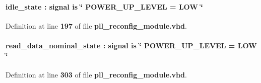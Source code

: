 \paragraph[{A\+L\+T\+E\+R\+A\+\_\+\+A\+T\+T\+R\+I\+B\+U\+TE}]{ {\bfseries {\bfseries {\bf idle\+\_\+state}} \textcolor{vhdlchar}{ }\textcolor{vhdlchar}{\+:}\textcolor{vhdlchar}{ }\textcolor{keywordflow}{signal}\textcolor{vhdlchar}{ }\textcolor{keywordflow}{is}\textcolor{vhdlchar}{ }\textcolor{vhdlchar}{ }\textcolor{vhdlchar}{ }\textcolor{vhdlchar}{ }\textcolor{keyword}{\char`\"{} P\+O\+W\+E\+R\+\_\+\+U\+P\+\_\+\+L\+E\+V\+E\+L = L\+O\+W \char`\"{}}\textcolor{vhdlchar}{ }} \hspace{0.3cm}{\ttfamily [Attribute]}}\label{classpll__reconfig__module__pllrcfg__ok11_1_1RTL_a00ff721b1163687a30ec2eb2ccb311f0}


Definition at line {\bf 197} of file {\bf pll\+\_\+reconfig\+\_\+module.\+vhd}.

\paragraph[{A\+L\+T\+E\+R\+A\+\_\+\+A\+T\+T\+R\+I\+B\+U\+TE}]{ {\bfseries {\bfseries {\bf read\+\_\+data\+\_\+nominal\+\_\+state}} \textcolor{vhdlchar}{ }\textcolor{vhdlchar}{\+:}\textcolor{vhdlchar}{ }\textcolor{keywordflow}{signal}\textcolor{vhdlchar}{ }\textcolor{keywordflow}{is}\textcolor{vhdlchar}{ }\textcolor{vhdlchar}{ }\textcolor{vhdlchar}{ }\textcolor{vhdlchar}{ }\textcolor{keyword}{\char`\"{} P\+O\+W\+E\+R\+\_\+\+U\+P\+\_\+\+L\+E\+V\+E\+L = L\+O\+W \char`\"{}}\textcolor{vhdlchar}{ }} \hspace{0.3cm}{\ttfamily [Attribute]}}\label{classpll__reconfig__module__pllrcfg__ok11_1_1RTL_ac3d7711827174ac81677eab9bc0da309}


Definition at line {\bf 303} of file {\bf pll\+\_\+reconfig\+\_\+module.\+vhd}.

